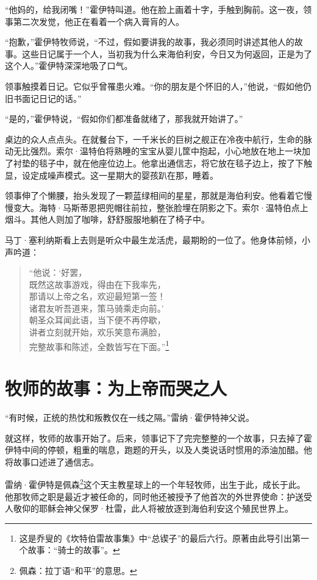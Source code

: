\documentclass[AutoFakeBold=true]{book}
\begin{document}
``他妈的，给我闭嘴！''霍伊特叫道。他在脸上画着十字，手触到胸前。这一夜，领事第二次发觉，他正在看着一个病入膏肓的人。

``抱歉，''霍伊特牧师说，``不过，假如要讲我的故事，我必须同时讲述其他人的故事。这些日记属于一个人，当初我为什么来海伯利安，今日又为何返回，正是为了这个人。''霍伊特深深地吸了口气。

领事触摸着日记。它似乎曾罹患火难。``你的朋友是个怀旧的人，''他说，``假如他仍旧书面记日记的话。''

``是的，''霍伊特说，``假如你们都准备就绪了，那我就开始讲了。''

桌边的众人点点头。在就餐台下，一千米长的巨树之舰正在冷夜中航行，生命的脉动无比强烈。索尔·温特伯将熟睡的宝宝从婴儿筐中抱起，小心地放在地上一块加了衬垫的毯子中，就在他座位边上。他拿出通信志，将它放在毯子边上，按了下触显，设定成噪声模式。这一星期大的婴孩趴在那，睡着。

领事伸了个懒腰，抬头发现了一颗蓝绿相间的星星，那就是海伯利安。他看着它慢慢变大。海特·马斯蒂恩把兜帽往前拉，整张脸埋在阴影之下。索尔·温特伯点上烟斗。其他人则加了咖啡，舒舒服服地躺在了椅子中。

马丁·塞利纳斯看上去则是听众中最生龙活虎，最期盼的一位了。他身体前倾，小声吟道：

\begin{quote}
	{\kaishu ``他说：`好罢，\\
	既然这故事游戏，得由在下我率先，\\
	那请以上帝之名，欢迎最短第一签！\\
	诸君友听吾道来，策马骑乘走向前。'\\
	朝圣众耳闻此语，当下便不再停歇，\\
	讲者立刻就开始，欢乐笑意布满脸，\\
	完整故事和陈述，全数皆写在下面。''}\footnote{这是乔叟的《坎特伯雷故事集》中``总锲子''的最后六行。原著由此导引出第一个故事：``骑士的故事''。}
\end{quote}

\section{牧师的故事：为上帝而哭之人}

``有时候，正统的热忱和叛教仅在一线之隔。''雷纳·霍伊特神父说。

就这样，牧师的故事开始了。后来，领事记下了完完整整的一个故事，只去掉了霍伊特中间的停顿，粗重的喘息，跑题的开头，以及人类说话时惯用的添油加醋。他将故事口述进了通信志。

雷纳·霍伊特是佩森\footnote{佩森：拉丁语``和平''的意思。}这个天主教星球上的一个年轻牧师，出生于此，成长于此。他那牧师之职是最近才被任命的，同时他还被授予了他首次的外世界使命：护送受人敬仰的耶稣会神父保罗·杜雷，此人将被放逐到海伯利安这个殖民世界上。
\end{document}
